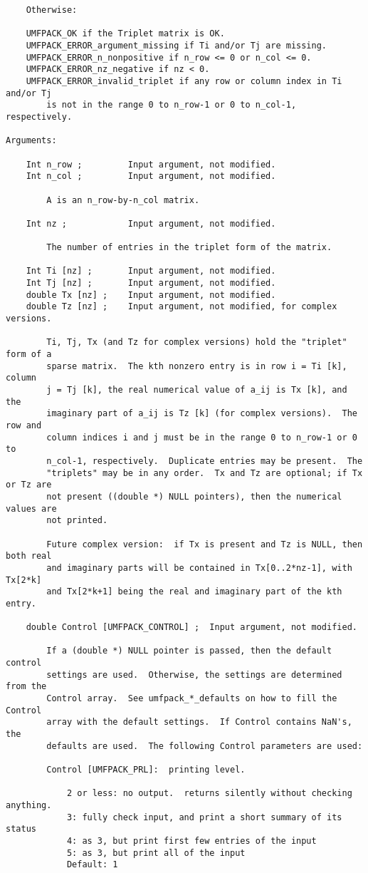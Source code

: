 {\begin{verbatim}
    Otherwise:

    UMFPACK_OK if the Triplet matrix is OK.
    UMFPACK_ERROR_argument_missing if Ti and/or Tj are missing.
    UMFPACK_ERROR_n_nonpositive if n_row <= 0 or n_col <= 0.
    UMFPACK_ERROR_nz_negative if nz < 0.
    UMFPACK_ERROR_invalid_triplet if any row or column index in Ti and/or Tj
        is not in the range 0 to n_row-1 or 0 to n_col-1, respectively.

Arguments:

    Int n_row ;         Input argument, not modified.
    Int n_col ;         Input argument, not modified.

        A is an n_row-by-n_col matrix.

    Int nz ;            Input argument, not modified.

        The number of entries in the triplet form of the matrix.

    Int Ti [nz] ;       Input argument, not modified.
    Int Tj [nz] ;       Input argument, not modified.
    double Tx [nz] ;    Input argument, not modified.
    double Tz [nz] ;    Input argument, not modified, for complex versions.

        Ti, Tj, Tx (and Tz for complex versions) hold the "triplet" form of a
        sparse matrix.  The kth nonzero entry is in row i = Ti [k], column
        j = Tj [k], the real numerical value of a_ij is Tx [k], and the
        imaginary part of a_ij is Tz [k] (for complex versions).  The row and
        column indices i and j must be in the range 0 to n_row-1 or 0 to
        n_col-1, respectively.  Duplicate entries may be present.  The
        "triplets" may be in any order.  Tx and Tz are optional; if Tx or Tz are
        not present ((double *) NULL pointers), then the numerical values are
        not printed.

        Future complex version:  if Tx is present and Tz is NULL, then both real
        and imaginary parts will be contained in Tx[0..2*nz-1], with Tx[2*k]
        and Tx[2*k+1] being the real and imaginary part of the kth entry.

    double Control [UMFPACK_CONTROL] ;  Input argument, not modified.

        If a (double *) NULL pointer is passed, then the default control
        settings are used.  Otherwise, the settings are determined from the
        Control array.  See umfpack_*_defaults on how to fill the Control
        array with the default settings.  If Control contains NaN's, the
        defaults are used.  The following Control parameters are used:

        Control [UMFPACK_PRL]:  printing level.

            2 or less: no output.  returns silently without checking anything.
            3: fully check input, and print a short summary of its status
            4: as 3, but print first few entries of the input
            5: as 3, but print all of the input
            Default: 1
\end{verbatim}
}

